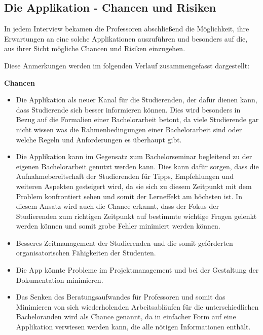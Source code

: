 \documentclass[bibliography=totoc,listof=totoc,BCOR=5mm,DIV=12,oneside]{scrbook}
\begin{document}
\newpage
\subsection{Die Applikation - Chancen und Risiken}
\par In jedem Interview bekamen die Professoren abschließend die Möglichkeit, ihre Erwartungen an eine solche Applikationen auszuführen und besonders auf die, aus ihrer Sicht mögliche Chancen und Risiken einzugehen. 
\par \bigskip Diese Anmerkungen werden im folgenden Verlauf zusammengefasst dargestellt:
\par \bigskip \textbf{Chancen}
\begin{itemize}
\item Die Applikation als neuer Kanal für die Studierenden, der dafür dienen kann, dass Studierende sich besser informieren können. Dies wird besonders in Bezug auf die Formalien einer Bachelorarbeit betont, da viele Studierende gar nicht wissen was die Rahmenbedingungen einer Bachelorarbeit sind oder welche Regeln und Anforderungen es überhaupt gibt.
\item Die Applikation kann im Gegensatz zum Bachelorseminar begleitend zu der eigenen Bachelorarbeit genutzt werden kann. Dies kann dafür sorgen, dass die Aufnahmebereitschaft der Studierenden für Tipps, Empfehlungen und weiteren Aspekten gesteigert wird, da sie sich zu diesem Zeitpunkt mit dem Problem konfrontiert sehen und somit der Lerneffekt am höchsten ist. In diesem Ansatz wird auch die Chance erkannt, dass der Fokus der Studierenden zum richtigen Zeitpunkt auf bestimmte wichtige Fragen gelenkt werden können und somit grobe Fehler minimiert werden können.
\item Besseres Zeitmanagement der Studierenden und die somit geförderten organisatorischen Fähigkeiten der Studenten.
\item Die App könnte Probleme im Projektmanagement und bei der Gestaltung der Dokumentation minimieren.
\item Das Senken des Beratungsaufwandes für Professoren und somit das Minimieren von sich wiederholenden Arbeitsabläufen für die unterschiedlichen Bacheloranden wird als Chance genannt, da in einfacher Form auf eine Applikation verwiesen werden kann, die alle nötigen Informationen enthält.
\end{itemize}
\end{document}
